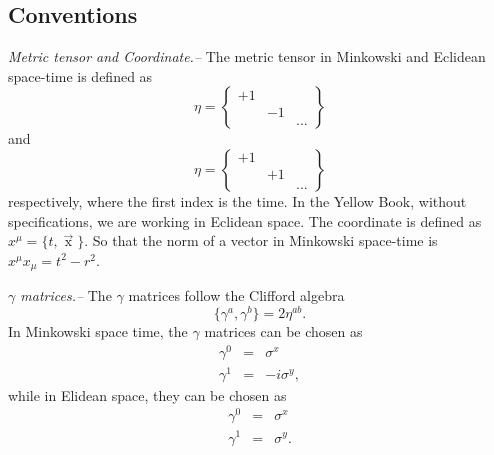 \documentclass[submission, PhysLectNotes]{SciPost}
\begin{document}
\subsection{Conventions}
{\it Metric tensor and Coordinate.--}  The metric tensor in Minkowski and Eclidean space-time is defined as
\begin{equation}
    \eta = \begin{Bmatrix}
        +1 &   &\\
           & -1& \\
           &   & ...
    \end{Bmatrix}
\end{equation}
and
\begin{equation}
    \eta = \begin{Bmatrix}
        +1 &   &\\
           & +1& \\
           &   & ...
    \end{Bmatrix}
\end{equation}
respectively, where the first index is the time. In the Yellow Book, without specifications, we are working in Eclidean space. The coordinate is defined as $x^\mu = \{t, \mathop{x}\limits^\rightarrow\}$. So that the norm of a vector in Minkowski space-time is $x^\mu x_\mu = t^2 - r^2$.

{\it $\gamma$ matrices.--}   The $\gamma$ matrices follow the Clifford algebra
\begin{equation}
    \{\gamma^a,\gamma^b\} = 2\eta^{ab}.
\end{equation}
In Minkowski space time, the $\gamma$ matrices can be chosen as
\begin{eqnarray}
    \gamma^0 &=& \sigma^x \nonumber \\
    \gamma^1 &=&  -i\sigma^y,
\end{eqnarray}
while in Elidean space, they can be chosen as
\begin{eqnarray}
    \gamma^0 &=& \sigma^x \nonumber \\
    \gamma^1 &=& \sigma^y.
\end{eqnarray}
\end{document}
